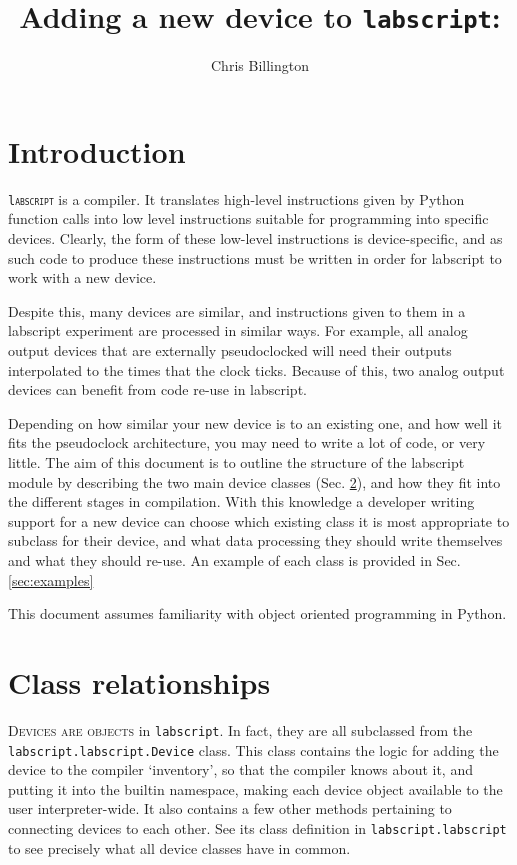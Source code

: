 \documentclass[a4paper,11pt,titlepage]{article}
\begin{document}
\title{Adding a new device to \texttt{labscript}: }
\author{Chris Billington}
\maketitle
\tableofcontents
\section{Introduction}\label{sec:concepts}

\lettrine[lines=3]{\texttt{l}}{\texttt{abscript}} is a compiler. It translates high-level instructions given by Python function calls into low level instructions suitable for programming into specific devices. Clearly, the form of these low-level instructions is device-specific, and as such code to produce these instructions must be written in order for labscript to work with a new device.

Despite this, many devices are similar, and instructions given to them in a labscript experiment are processed in similar ways. For example, all analog output devices that are externally pseudoclocked will need their outputs interpolated to the times that the clock ticks. Because of this, two analog output devices can benefit from code re-use in labscript.

Depending on how similar your new device is to an existing one, and how well it fits the pseudoclock architecture, you may need to write a lot of code, or very little. The aim of this document is to outline the structure of the labscript module by describing the two main device classes (Sec. \ref{sec:classes}), and how they fit into the different stages in compilation. With this knowledge a developer writing support for a new device can choose which existing class it is most appropriate to subclass for their device, and what data processing they should write themselves and what they should re-use. An example of each class is provided in Sec. \ref{sec:examples}

This document assumes familiarity with object oriented programming in Python.

\section{Class relationships}\label{sec:classes}
\lettrine[lines=3]{D}{evices are objects} in \texttt{labscript}. In fact, they are all subclassed from the \texttt{labscript.labscript.Device} class. This class contains the logic for adding the device to the compiler `inventory', so that the compiler knows about it, and putting it into the builtin namespace, making each device object available to the user interpreter-wide. It also contains a few other methods pertaining to connecting devices to each other. See its class definition in \texttt{labscript.labscript} to see precisely what all device classes have in common.
\end{document}
